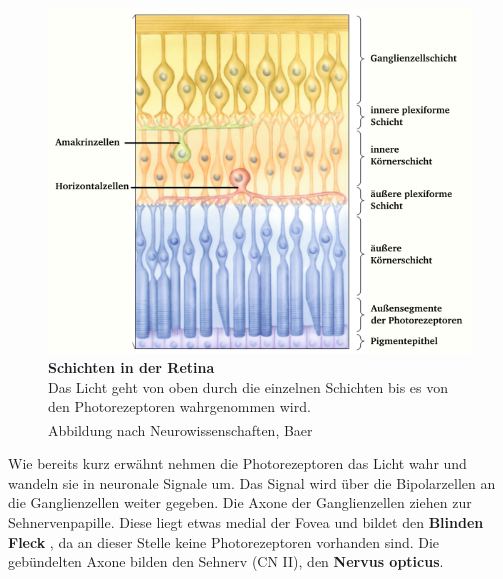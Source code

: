 \documentclass[12pt,a4paper,pdftex]{article}
\begin{document}
\begin{figure}[H]
    \centering
    \includegraphics{pictures/visual/retina.png}
    \caption[Schichten in der Retina]{\textbf{Schichten in der Retina}\\
    Das Licht geht von oben durch die einzelnen Schichten bis es von den Photorezeptoren wahrgenommen wird. \\
    Abbildung nach Neurowissenschaften, Baer \textsuperscript{\cite[10]{neurowissenschaften_baer}}}
    \label{fig:retina}
\end{figure}

Wie bereits kurz erwähnt nehmen die Photorezeptoren das Licht wahr und wandeln sie in neuronale Signale um. Das Signal wird über die Bipolarzellen an die Ganglienzellen weiter gegeben. Die Axone der Ganglienzellen ziehen zur Sehnervenpapille. Diese liegt etwas medial der Fovea und bildet den \textbf{Blinden Fleck} , da an dieser Stelle keine Photorezeptoren vorhanden sind. Die gebündelten Axone bilden den Sehnerv (CN II), den \textbf{Nervus opticus}.  
\end{document}
